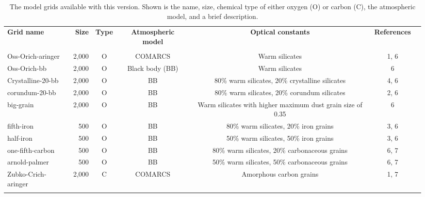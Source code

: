 \documentclass[onecolumn]{aastex63}
\begin{document}
\vspace{3cm}
\begin{table*}
    \centering
    \caption{The model grids available with this version. Shown is the name, size, chemical type of either oxygen (O) or carbon (C), the atmospheric model, and a brief description. \vspace{0.2cm}}
    \begin{tabular}{ l r c c c c c}
    \hline
    \textbf{Grid name} & \textbf{Size} & \textbf{Type} & \textbf{Atmospheric model} & \textbf{Optical constants} & \textbf{References} \\
    \Xhline{3\arrayrulewidth} \\
    \vspace{0.1cm}
    Oss-Orich-aringer & 2,000 & O & COMARCS & Warm silicates & 1, 6 \\
    \vspace{0.1cm}
    Oss-Orich-bb & 2,000 & O & Black body (BB) & Warm silicates & 6\\
    \vspace{0.1cm}
    Crystalline-20-bb & 2,000 & O & BB & 80\% warm silicates, 20\% crystalline silicates & 4, 6\\
    \vspace{0.1cm}
    corundum-20-bb & 2,000 & O & BB & 80\% warm silicates, 20\% corundum silicates &  2, 6\\
    \vspace{0.1cm}
    big-grain & 2,000 & O & BB & Warm silicates with higher maximum dust grain size of 0.35 &  6\\
    \vspace{0.1cm}
    fifth-iron & 500 & O & BB & 80\% warm silicates, 20\% iron grains &  3, 6\\
    \vspace{0.1cm}
    half-iron & 500 & O & BB & 50\% warm silicates, 50\% iron grains &  3, 6 \\
    \vspace{0.1cm}
    one-fifth-carbon & 500 & O & BB & 80\% warm silicates, 20\% carbonaceous grains &  6, 7\\
    \vspace{0.1cm}
    arnold-palmer & 500 & O & BB & 50\% warm silicates, 50\% carbonaceous grains &  6, 7\\
    \vspace{0.1cm}
    Zubko-Crich-aringer & 2,000 & C & COMARCS & Amorphous carbon grains &  1, 7\\
    \vspace{0.1cm}

\end{tabular}
\end{table*}
\end{document}
